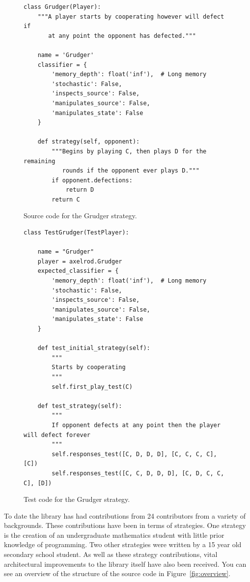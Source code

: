 \documentclass{article}
\begin{document}
\begin{figure}[!hbtp]
    \begin{verbatim}
class Grudger(Player):
    """A player starts by cooperating however will defect if
       at any point the opponent has defected."""

    name = 'Grudger'
    classifier = {
        'memory_depth': float('inf'),  # Long memory
        'stochastic': False,
        'inspects_source': False,
        'manipulates_source': False,
        'manipulates_state': False
    }

    def strategy(self, opponent):
        """Begins by playing C, then plays D for the remaining
           rounds if the opponent ever plays D."""
        if opponent.defections:
            return D
        return C
    \end{verbatim}
    \caption{Source code for the Grudger strategy.}
    \label{fig:grudger}
\end{figure}



\begin{figure}[!hbtp]
    \begin{verbatim}
class TestGrudger(TestPlayer):

    name = "Grudger"
    player = axelrod.Grudger
    expected_classifier = {
        'memory_depth': float('inf'),  # Long memory
        'stochastic': False,
        'inspects_source': False,
        'manipulates_source': False,
        'manipulates_state': False
    }

    def test_initial_strategy(self):
        """
        Starts by cooperating
        """
        self.first_play_test(C)

    def test_strategy(self):
        """
        If opponent defects at any point then the player will defect forever
        """
        self.responses_test([C, D, D, D], [C, C, C, C], [C])
        self.responses_test([C, C, D, D, D], [C, D, C, C, C], [D])
    \end{verbatim}
    \caption{Test code for the Grudger strategy.}
    \label{fig:grudger_test}
\end{figure}

To date the library has had contributions from 24 contributors from a variety of
backgrounds. These contributions have been in terms of strategies. One strategy
is the creation of an undergraduate mathematics student with little prior
knowledge of programming. Two other strategies were written by a 15 year old
secondary school student. As well as these strategy contributions, vital
architectural improvements to the library itself have also been received. You
can see an overview of the structure of the source code in
Figure~\ref{fig:overview}.
\end{document}
